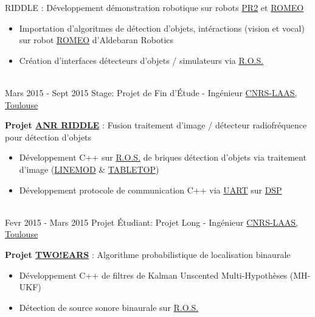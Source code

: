 \documentclass[letterpaper]{twentysecondcv} %
\begin{document}
\begin{twenty}
{{{        RIDDLE}} : Développement démonstration robotique sur robots \href{http://www.willowgarage.com/pages/pr2/overview}{PR2} et \href{https://spectrum.ieee.org/automaton/robotics/humanoids/aldebaran-robotics-introduces-romeo-finally}{ROMEO}
    \begin{itemize}
    \item Importation d'algoritmes de détection d'objets, intéractions (vision
      et vocal) sur robot
      \href{https://spectrum.ieee.org/automaton/robotics/humanoids/aldebaran-robotics-introduces-romeo-finally}{ROMEO}
      d'Aldebaran Robotics
    \item Création d'interfaces détecteurs d'objets / simulateurs via \href{http://www.ros.org/}{R.O.S.}
    \end{itemize}
  }
  \\
  \twentyitem
  {Mars 2015 -}
  {Sept 2015}
  {Stage: Projet de Fin d'Étude - Ingénieur}
  {\href{https://www.laas.fr/public/fr}{CNRS-LAAS, Toulouse}}
  {}
  {
    \textbf{Projet
      \href{http://www.agence-nationale-recherche.fr/Project-ANR-12-CORD-0003}{ANR
        RIDDLE}} : Fusion traitement d'image / détecteur radiofréquence pour
    détection d'objets
    \begin{itemize}
    \item Développement C++ sur \href{http://www.ros.org/}{R.O.S.} de briques
      détection d'objets via traitement d'image
      (\href{http://www.stefan-hinterstoisser.com/papers/hinterstoisser2011linemod.pdf}{LINEMOD}
      \& \href{http://wiki.ros.org/tabletop_object_detector}{TABLETOP})
    \item Développement protocole de communication C++ via
      \href{https://en.wikipedia.org/wiki/Universal_asynchronous_receiver-transmitter}{UART}
      sur \href{https://en.wikipedia.org/wiki/Digital_signal_processor}{DSP}
    \end{itemize}
  }
  \\
  \twentyitem
  {Fevr 2015 -}
  {Mars 2015}
  {Projet Étudiant: Projet Long - Ingénieur}
  {\href{https://www.laas.fr/public/fr}{CNRS-LAAS, Toulouse}}
  {}
  {
    \textbf{Projet
      \href{http://twoears.eu/}{TWO!EARS}} : Algorithme probabilistique de
    localisation binaurale
    \begin{itemize}
    \item Développement C++ de filtres de Kalman Unscented Multi-Hypothèses
      (MH-UKF)
    \item Détection de source sonore binaurale sur
      \href{http://www.ros.org/}{R.O.S.}
    \end{itemize}
}
\end{twenty}
\end{document}
